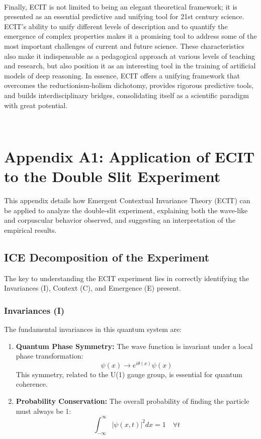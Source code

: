 \documentclass{article}
\begin{document}
\paragraph{}
Finally, ECIT is not limited to being an elegant theoretical framework; it is presented as an essential predictive and unifying tool for 21st century science. ECIT's ability to unify different levels of description and to quantify the emergence of complex properties makes it a promising tool to address some of the most important challenges of current and future science. These characteristics also make it indispensable as a pedagogical approach at various levels of teaching and research, but also position it as an interesting tool in the training of artificial models of deep reasoning. In essence, ECIT offers a unifying framework that overcomes the reductionism-holism dichotomy, provides rigorous predictive tools, and builds interdisciplinary bridges, consolidating itself as a scientific paradigm with great potential.

\newpage
\
\maketitle

\section{Appendix A1: Application of ECIT to the Double Slit Experiment}\label{ApendiceA1}

This appendix details how Emergent Contextual Invariance Theory (ECIT) can be applied to analyze the double-slit experiment, explaining both the wave-like and corpuscular behavior observed, and suggesting an interpretation of the empirical results.

\subsection{ICE Decomposition of the Experiment}

The key to understanding the ECIT experiment lies in correctly identifying the Invariances (I), Context (C), and Emergence (E) present.

\subsubsection{Invariances (I)}

The fundamental invariances in this quantum system are:
\begin{enumerate}
\item \textbf{Quantum Phase Symmetry:} The wave function is invariant under a local phase transformation:
$$ \psi(x) \rightarrow e^{i\theta(x)} \psi(x) $$
This symmetry, related to the U(1) gauge group, is essential for quantum coherence.
\item \textbf{Probability Conservation:} The overall probability of finding the particle must always be 1:
    $$ \int_{-\infty}^{\infty} |\psi(x,t)|^2 dx = 1 \quad \forall t $$
\end{enumerate}
\end{document}
